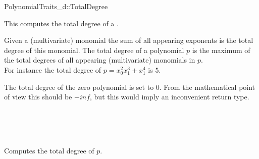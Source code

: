 \begin{ccRefConcept}{PolynomialTraits_d::TotalDegree}

\ccDefinition

This  computes the total degree 
of a . 

Given a (multivariate) monomial the sum of all appearing exponents 
is the total degree of this monomial. 
The total degree of a polynomial $p$ is the maximum of the total degrees 
of all appearing (multivariate) monomials in $p$.\\
For instance the total degree of $p = x_0^2x_1^3+x_1^4$ is $5$.

The total degree of the zero polynomial is set to $0$. 
From the mathematical point of view this should 
be $-inf$, but this would imply an inconvenient return type. 

 

\ccRefines 
{}\\
\\
\\


\ccTypes

\ccGlue
{}

\ccOperations
{}
         {Computes the total degree of $p$.}



\ccSeeAlso

\\
\\
\\

\end{ccRefConcept}
